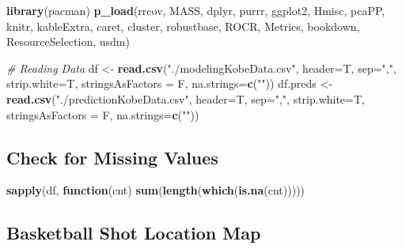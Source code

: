 \documentclass[american,]{article}
\newenvironment{Shaded}{\begin{snugshade}}{\end{snugshade}}
\newcommand{\CommentTok}[1]{\textcolor[rgb]{0.56,0.35,0.01}{\textit{#1}}}
\newcommand{\ControlFlowTok}[1]{\textcolor[rgb]{0.13,0.29,0.53}{\textbf{#1}}}
\newcommand{\DataTypeTok}[1]{\textcolor[rgb]{0.13,0.29,0.53}{#1}}
\newcommand{\KeywordTok}[1]{\textcolor[rgb]{0.13,0.29,0.53}{\textbf{#1}}}
\newcommand{\NormalTok}[1]{#1}
\newcommand{\StringTok}[1]{\textcolor[rgb]{0.31,0.60,0.02}{#1}}
\begin{document}
\begin{Shaded}
\begin{Highlighting}[]


\KeywordTok{library}\NormalTok{(pacman)}
\KeywordTok{p_load}\NormalTok{(rrcov, MASS, dplyr, purrr, ggplot2, Hmisc, pcaPP, knitr, kableExtra, caret, }
\NormalTok{cluster, robustbase, ROCR, Metrics, bookdown, ResourceSelection, usdm)}

\CommentTok{# Reading Data}
\NormalTok{df <-}\StringTok{ }\KeywordTok{read.csv}\NormalTok{(}\StringTok{"./modelingKobeData.csv"}\NormalTok{, }\DataTypeTok{header=}\NormalTok{T, }\DataTypeTok{sep=}\StringTok{","}\NormalTok{, }\DataTypeTok{strip.white=}\NormalTok{T, }
\DataTypeTok{stringsAsFactors =}\NormalTok{ F, }\DataTypeTok{na.strings=}\KeywordTok{c}\NormalTok{(}\StringTok{""}\NormalTok{))}
\NormalTok{df.preds <-}\StringTok{ }\KeywordTok{read.csv}\NormalTok{(}\StringTok{"./predictionKobeData.csv"}\NormalTok{, }\DataTypeTok{header=}\NormalTok{T, }\DataTypeTok{sep=}\StringTok{","}\NormalTok{, }
\DataTypeTok{strip.white=}\NormalTok{T, }\DataTypeTok{stringsAsFactors =}\NormalTok{ F, }\DataTypeTok{na.strings=}\KeywordTok{c}\NormalTok{(}\StringTok{""}\NormalTok{))}
\end{Highlighting}
\end{Shaded}

\hypertarget{check-for-missing-values}{%
\subsection{Check for Missing Values}\label{check-for-missing-values}}

\begin{Shaded}
\begin{Highlighting}[]
\KeywordTok{sapply}\NormalTok{(df, }\ControlFlowTok{function}\NormalTok{(cnt) }\KeywordTok{sum}\NormalTok{(}\KeywordTok{length}\NormalTok{(}\KeywordTok{which}\NormalTok{(}\KeywordTok{is.na}\NormalTok{(cnt)))))}
\end{Highlighting}
\end{Shaded}

\hypertarget{basketball-shot-location-map}{%
\subsection{Basketball Shot Location Map}\label{basketball-shot-location-map}}
\end{document}
